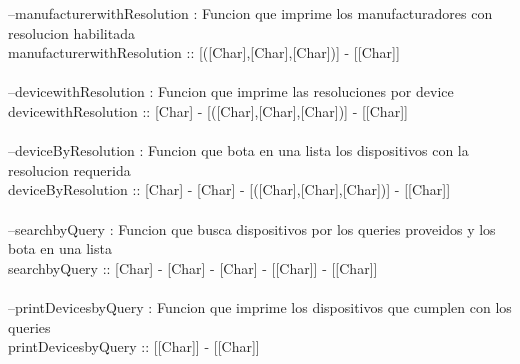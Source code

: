 \documentclass[11pt]{article} %
\begin{document}
--manufacturerwithResolution : Funcion que imprime los manufacturadores con resolucion habilitada\\
manufacturerwithResolution :: [([Char],[Char],[Char])] - [[Char]]\\\\
--devicewithResolution : Funcion que imprime las resoluciones por device\\
devicewithResolution :: [Char] - [([Char],[Char],[Char])] - [[Char]]\\\\
--deviceByResolution : Funcion que bota en una lista los dispositivos con la resolucion requerida\\
deviceByResolution :: [Char] - [Char] - [([Char],[Char],[Char])] - [[Char]]\\\\
--searchbyQuery : Funcion que busca dispositivos por los queries proveidos y los bota en una lista\\
searchbyQuery :: [Char] - [Char] - [Char] - [[Char]] - [[Char]]\\\\
--printDevicesbyQuery : Funcion que imprime los dispositivos que cumplen con los queries\\
printDevicesbyQuery :: [[Char]] - [[Char]]\\\\
\end{document}
